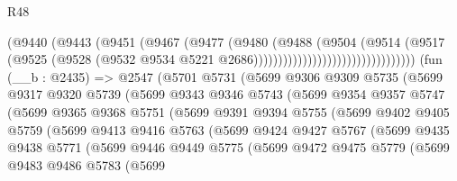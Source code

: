 \begin{lexlean}{R48}
\begin{coremodule}
                                            (@9440
                                              (@9443
                                                (@9451
                                                  (@9467
                                                    (@9477
                                                      (@9480
                                                        (@9488
                                                          (@9504
                                                            (@9514
                                                              (@9517
                                                                (@9525
                                                                  (@9528
                                                                    (@9532
                                                                      @9534
                                                                      @5221
                                                                      @2686)))))))))))))))))))))))))))))))))
    (fun (__b : @2435) =>
    @2547
      (@5701
        @5731
        (@5699
          @9306
          @9309
          @5735
          (@5699
            @9317
            @9320
            @5739
            (@5699
              @9343
              @9346
              @5743
              (@5699
                @9354
                @9357
                @5747
                (@5699
                  @9365
                  @9368
                  @5751
                  (@5699
                    @9391
                    @9394
                    @5755
                    (@5699
                      @9402
                      @9405
                      @5759
                      (@5699
                        @9413
                        @9416
                        @5763
                        (@5699
                          @9424
                          @9427
                          @5767
                          (@5699
                            @9435
                            @9438
                            @5771
                            (@5699
                              @9446
                              @9449
                              @5775
                              (@5699
                                @9472
                                @9475
                                @5779
                                (@5699
                                  @9483
                                  @9486
                                  @5783
                                  (@5699

\end{coremodule}
\end{lexlean}
